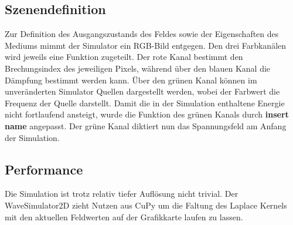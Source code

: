 \subsection{Szenendefinition}
Zur Definition des Ausgangszustands des Feldes sowie der Eigenschaften des Mediums mimmt der Simulator ein RGB-Bild entgegen.
Den drei Farbkanälen wird jeweils eine Funktion zugeteilt.
Der rote Kanal bestimmt den Brechungsindex des jeweiligen Pixels, während über den blauen Kanal die Dämpfung bestimmt werden kann.
Über den grünen Kanal können im unveränderten Simulator Quellen dargestellt werden, wobei der Farbwert die Frequenz der Quelle darstellt.
Damit die in der Simulation enthaltene Energie nicht fortlaufend ansteigt, wurde die Funktion des grünen Kanals durch \textbf{insert name} angepasst. %
Der grüne Kanal diktiert nun das Spannungsfeld am Anfang der Simulation. %

\subsection{Performance} %
Die Simulation ist trotz relativ tiefer Auflösung nicht trivial. 
Der WaveSimulator2D zieht Nutzen aus CuPy um die Faltung des Laplace Kernels mit den aktuellen Feldwerten auf der Grafikkarte laufen zu lassen.
